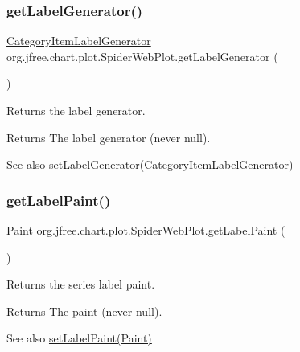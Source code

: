 \subsubsection{\texorpdfstring{get\+Label\+Generator()}{getLabelGenerator()}}
{\footnotesize\ttfamily \mbox{\hyperlink{interfaceorg_1_1jfree_1_1chart_1_1labels_1_1_category_item_label_generator}{Category\+Item\+Label\+Generator}} org.\+jfree.\+chart.\+plot.\+Spider\+Web\+Plot.\+get\+Label\+Generator (\begin{DoxyParamCaption}{ }\end{DoxyParamCaption})}

Returns the label generator.

\begin{DoxyReturn}{Returns}
The label generator (never {\ttfamily null}).
\end{DoxyReturn}
\begin{DoxySeeAlso}{See also}
\mbox{\hyperlink{classorg_1_1jfree_1_1chart_1_1plot_1_1_spider_web_plot_a9910d82d876e9229115d36b0bdbc8174}{set\+Label\+Generator(\+Category\+Item\+Label\+Generator)}} 
\end{DoxySeeAlso}
\mbox{\label{classorg_1_1jfree_1_1chart_1_1plot_1_1_spider_web_plot_a89122725e5bb2963445c64d779f386c7}} 
\subsubsection{\texorpdfstring{get\+Label\+Paint()}{getLabelPaint()}}
{\footnotesize\ttfamily Paint org.\+jfree.\+chart.\+plot.\+Spider\+Web\+Plot.\+get\+Label\+Paint (\begin{DoxyParamCaption}{ }\end{DoxyParamCaption})}

Returns the series label paint.

\begin{DoxyReturn}{Returns}
The paint (never {\ttfamily null}).
\end{DoxyReturn}
\begin{DoxySeeAlso}{See also}
\mbox{\hyperlink{classorg_1_1jfree_1_1chart_1_1plot_1_1_spider_web_plot_a360a2dd69ff25f10ec2f33cdc9602a0a}{set\+Label\+Paint(\+Paint)}} 
\end{DoxySeeAlso}
\mbox{\label{classorg_1_1jfree_1_1chart_1_1plot_1_1_spider_web_plot_ab325d38f739c0d3816f3f43f21200635}} 
